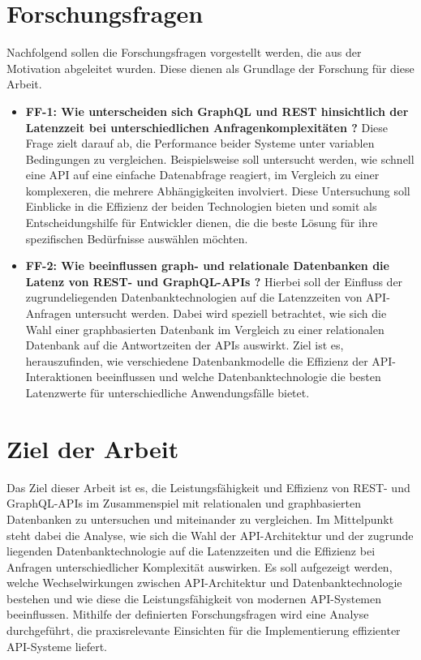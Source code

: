 \section{Forschungsfragen} %
\label{sec:forschungsfragen}
Nachfolgend sollen die Forschungsfragen vorgestellt werden, die aus der Motivation abgeleitet wurden. Diese dienen als Grundlage der Forschung für diese Arbeit.
\begin{itemize}
	\item \textbf{FF-1: Wie unterscheiden sich GraphQL und REST hinsichtlich der Latenzzeit bei unterschiedlichen Anfragenkomplexitäten ?}  Diese Frage zielt darauf ab, die Performance beider Systeme unter variablen Bedingungen zu vergleichen. Beispielsweise soll untersucht werden, wie schnell eine API auf eine einfache Datenabfrage reagiert, im Vergleich zu einer komplexeren, die mehrere Abhängigkeiten involviert. Diese Untersuchung soll Einblicke in die Effizienz der beiden Technologien bieten und somit als Entscheidungshilfe für Entwickler dienen, die die beste Lösung für ihre spezifischen Bedürfnisse auswählen möchten.
	\item \textbf{FF-2: Wie beeinflussen graph- und relationale Datenbanken die Latenz von REST- und GraphQL-APIs ?} Hierbei soll der Einfluss der zugrundeliegenden Datenbanktechnologien auf die Latenzzeiten von API-Anfragen untersucht werden. Dabei wird speziell betrachtet, wie sich die Wahl einer graphbasierten Datenbank im Vergleich zu einer relationalen Datenbank auf die Antwortzeiten der APIs auswirkt. Ziel ist es, herauszufinden, wie verschiedene Datenbankmodelle die Effizienz der API-Interaktionen beeinflussen und welche Datenbanktechnologie die besten Latenzwerte für unterschiedliche Anwendungsfälle bietet.
\end{itemize} 
\section{Ziel der Arbeit} %
\label{sec:zielderarbeit}
Das Ziel dieser Arbeit ist es, die Leistungsfähigkeit und Effizienz von REST- und GraphQL-APIs im Zusammenspiel mit relationalen und graphbasierten Datenbanken zu untersuchen und miteinander zu vergleichen. Im Mittelpunkt steht dabei die Analyse, wie sich die Wahl der API-Architektur und der zugrunde liegenden Datenbanktechnologie auf die Latenzzeiten und die Effizienz bei Anfragen unterschiedlicher Komplexität auswirken. Es soll aufgezeigt werden, welche Wechselwirkungen zwischen API-Architektur und Datenbanktechnologie bestehen und wie diese die Leistungsfähigkeit von modernen API-Systemen beeinflussen. Mithilfe der definierten Forschungsfragen wird eine Analyse durchgeführt, die praxisrelevante Einsichten für die Implementierung effizienter API-Systeme liefert.
\newpage

